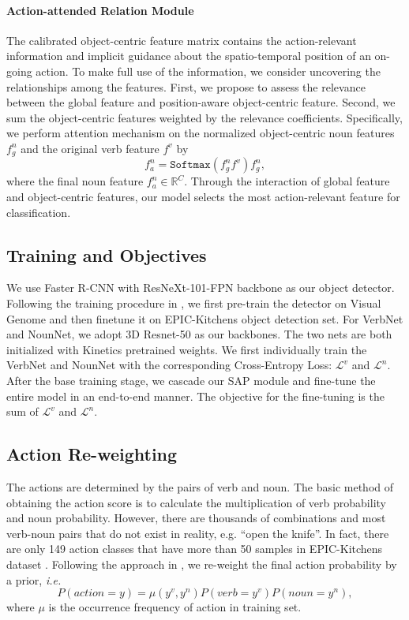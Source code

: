 \documentclass[letterpaper]{article} \usepackage{aaai20}  \usepackage{times}  \usepackage{helvet} \usepackage{courier}  \usepackage[hyphens]{url}  \usepackage{graphicx} \urlstyle{rm} \def\UrlFont{\rm}  \usepackage{graphicx}  \frenchspacing  \setlength{\pdfpagewidth}{8.5in}  \setlength{\pdfpageheight}{11in}  \usepackage{amsfonts,amssymb}
\begin{document}
\paragraph{Action-attended Relation Module}
The calibrated object-centric feature matrix contains the action-relevant information and implicit guidance about the spatio-temporal position of an on-going action. To make full use of the information, we consider uncovering the relationships among the features. First, we propose to assess the relevance between the global feature and position-aware object-centric feature. Second, we sum the object-centric features weighted by the relevance coefficients.
Specifically, we perform attention mechanism on the normalized object-centric noun features $f^n_g$ and the original verb feature $f^v$ by
\begin{equation}
{f^n_a} =\texttt{Softmax}({f^n_g}{f^v}){f^n_g},
\end{equation}
where the final noun feature ${f^n_a} \in \mathbb{R}^{C}$.
Through the interaction of global feature and object-centric features, our model selects the most action-relevant feature for classification.

\subsection{Training and Objectives}
We use Faster R-CNN with ResNeXt-101-FPN backbone as our object detector. Following the training procedure in \cite{Wu2018LongTermFB},
we first pre-train the detector on Visual Genome and then finetune it on EPIC-Kitchens object detection set. For VerbNet and NounNet, we adopt 3D Resnet-50 \cite{Hara2018CanS3} as our backbones. The two nets are both initialized with Kinetics pretrained weights. We first individually train the VerbNet and NounNet with the corresponding Cross-Entropy Loss: $\mathcal{L}^{v}$ and $\mathcal{L}^{n}$. After the base training stage, we cascade our SAP module and fine-tune the entire model in an end-to-end manner. The objective for the fine-tuning is the sum of $\mathcal{L}^{v}$ and $\mathcal{L}^{n}$.


\subsection{Action Re-weighting}

The actions are determined by the pairs of verb and noun. 
The basic method of obtaining the action score is to calculate the multiplication of verb probability and noun probability. 
However, there are thousands of combinations and most verb-noun pairs that do not exist in reality, e.g. ``open the knife''. In fact, there are only 149 action classes that have more than 50 samples in EPIC-Kitchens dataset \cite{Damen2018ScalingEV}. 
Following the approach in \cite{Wu2018LongTermFB}, we 
re-weight the final action probability by a prior, \textit{i.e.}
\begin{equation}
  P({action}=y) = \mu(y^v,y^n) P({verb}=y^v)P({noun}=y^n),
\end{equation}
where $\mu$ is the occurrence frequency of action in training set.
\end{document}

